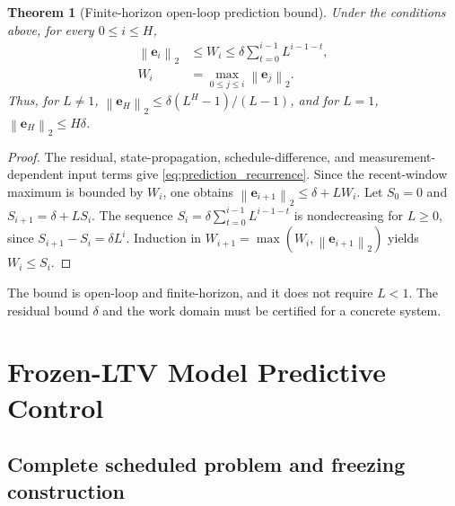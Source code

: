 \documentclass[journal]{IEEEtran}
\newtheorem{theorem}{Theorem}
\newcommand{\ve}{\mathbf{e}}
\newcommand{\norm}[1]{\left\lVert #1\right\rVert}
\begin{document}
\begin{theorem}[Finite-horizon open-loop prediction bound]
\label{thm:prediction_bound}
Under the conditions above, for every $0\le i\le H$,
\begin{align}
    \norm{\ve_i}_2&\le W_i\le \delta\sum_{t=0}^{i-1}L^{i-1-t},
    \label{eq:prediction_bound}
    \\
    W_i&=\max_{0\le j\le i}\norm{\ve_j}_2.
    \label{eq:prediction_error_maximum}
\end{align}
Thus, for $L\ne1$, $\norm{\ve_H}_2\le\delta(L^H-1)/(L-1)$, and for $L=1$, $\norm{\ve_H}_2\le H\delta$.
\end{theorem}
\begin{proof}
The residual, state-propagation, schedule-difference, and measurement-dependent input terms give \eqref{eq:prediction_recurrence}. Since the recent-window maximum is bounded by $W_i$, one obtains $\norm{\ve_{i+1}}_2\le\delta+LW_i$. Let $S_0=0$ and $S_{i+1}=\delta+LS_i$. The sequence $S_i=\delta\sum_{t=0}^{i-1}L^{i-1-t}$ is nondecreasing for $L\ge0$, since $S_{i+1}-S_i=\delta L^i$. Induction in $W_{i+1}=\max(W_i,\norm{\ve_{i+1}}_2)$ yields $W_i\le S_i$.
\end{proof}

The bound is open-loop and finite-horizon, and it does not require $L<1$. The residual bound $\delta$ and the work domain must be certified for a concrete system.

\section{Frozen-LTV Model Predictive Control}
\label{sec:control}

\subsection{Complete scheduled problem and freezing construction}
\end{document}
